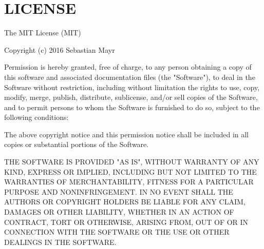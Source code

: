 \chapter{LICENSE}
\hypertarget{md_pkiclassroomrescheduler_2src_2main_2frontend_2node__modules_2workbox-build_2node__modules_2tr46_2_l_i_c_e_n_s_e}{}\label{md_pkiclassroomrescheduler_2src_2main_2frontend_2node__modules_2workbox-build_2node__modules_2tr46_2_l_i_c_e_n_s_e}
The MIT License (MIT)

Copyright (c) 2016 Sebastian Mayr

Permission is hereby granted, free of charge, to any person obtaining a copy of this software and associated documentation files (the "{}\+Software"{}), to deal in the Software without restriction, including without limitation the rights to use, copy, modify, merge, publish, distribute, sublicense, and/or sell copies of the Software, and to permit persons to whom the Software is furnished to do so, subject to the following conditions\+:

The above copyright notice and this permission notice shall be included in all copies or substantial portions of the Software.

THE SOFTWARE IS PROVIDED "{}\+AS IS"{}, WITHOUT WARRANTY OF ANY KIND, EXPRESS OR IMPLIED, INCLUDING BUT NOT LIMITED TO THE WARRANTIES OF MERCHANTABILITY, FITNESS FOR A PARTICULAR PURPOSE AND NONINFRINGEMENT. IN NO EVENT SHALL THE AUTHORS OR COPYRIGHT HOLDERS BE LIABLE FOR ANY CLAIM, DAMAGES OR OTHER LIABILITY, WHETHER IN AN ACTION OF CONTRACT, TORT OR OTHERWISE, ARISING FROM, OUT OF OR IN CONNECTION WITH THE SOFTWARE OR THE USE OR OTHER DEALINGS IN THE SOFTWARE. 